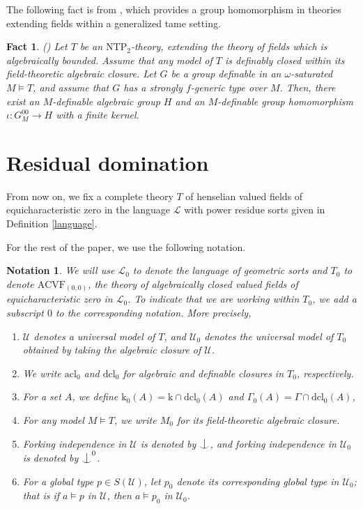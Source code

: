 \documentclass[12pt]{article}
\newcommand{\ACVF}{\mathrm{ACVF}}
\newcommand{\NTP}{\mathrm{NTP_2}}
\newcommand{\acl}{\mathrm{acl}}
\newcommand{\dcl}{\mathrm{dcl}}
\newcommand{\0}{\emptyset}
\newcommand{\vg}{\Gamma}
\newcommand{\rf}{\mathrm{k}}
\newcommand{\U}{\mathcal{U}}
\newcommand{\Ualg}{\mathcal{U}_0}
\def\forkindep{\mathrel{\raise0.2ex\hbox{\ooalign{\hidewidth$\vert$\hidewidth\cr\raise-0.9ex\hbox{$\smile$}}}}}
\theoremstyle{plain}%
\newtheorem{fact}[thm]{Fact}
\newtheorem{notation}[thm]{Notation}
\theoremstyle{definition}
\theoremstyle{remark}
\begin{document}
The following fact is from \cite{MOS20}, which provides a group homomorphism in theories extending fields within a generalized tame setting. 
\begin{fact}\label{group_chunk_ntp2}(\cite[Theorem 2.19]{MOS20}) Let $T$ be an $\NTP$-theory, extending the theory of fields which is algebraically bounded. Assume that any model of $T$ is definably closed within its field-theoretic algebraic closure. Let $G$ be a group definable in an $\omega$-saturated $M\models T$, and assume that $G$ has a strongly $f$-generic type over $M$. Then, there exist an $M$-definable algebraic group $H$ and an $M$-definable group homomorphism $\iota: G_M^{00}\to H$ with a finite kernel.
\end{fact}


   
\section{Residual domination}\label{Residual Domination}

From now on, we fix a complete theory $T$ of henselian valued fields of equicharacteristic zero in the language $\mathcal{L}$ with power residue sorts given in Definition \ref{language}. 

For the rest of the paper, we use the following notation.
\begin{notation}\label{notation_main_2}
We will use $\mathcal{L}_0$ to denote the language of geometric sorts and $T_0$ to denote $\ACVF_{(0,0)}$, the theory of algebraically closed valued fields of equicharacteristic zero in $\mathcal{L}_0$. To indicate that we are working within $T_0$, we add a subscript $0$ to the corresponding notation. More precisely,

\begin{enumerate}
    \item $\U$ denotes a universal model of $T$, and $\Ualg$ denotes the universal model of $T_0$ obtained by taking the algebraic closure of $\U$.
    \item We write $\acl_0$ and $\dcl_0$ for algebraic and definable closures in $T_0$, respectively.
    \item For a set $A$, we define $\rf_0(A)=\rf\cap\dcl_0(A)$ and $\vg_0(A)=\vg\cap\dcl_0(A)$,
    \item For any model $M\models T$, we write $M_0$ for its field-theoretic algebraic closure.
    
    \item Forking independence in $\U$ is denoted by $\forkindep$, and forking independence in $\Ualg$ is denoted by $\forkindep^0$.
    \item For a global type $p \in S(\U)$, let $p_0$ denote its corresponding global type in $\Ualg$; that is if $a \models p$ in $\U$, then $a \models p_0$ in $\Ualg$.
\end{enumerate} 
\end{notation}
\end{document}

